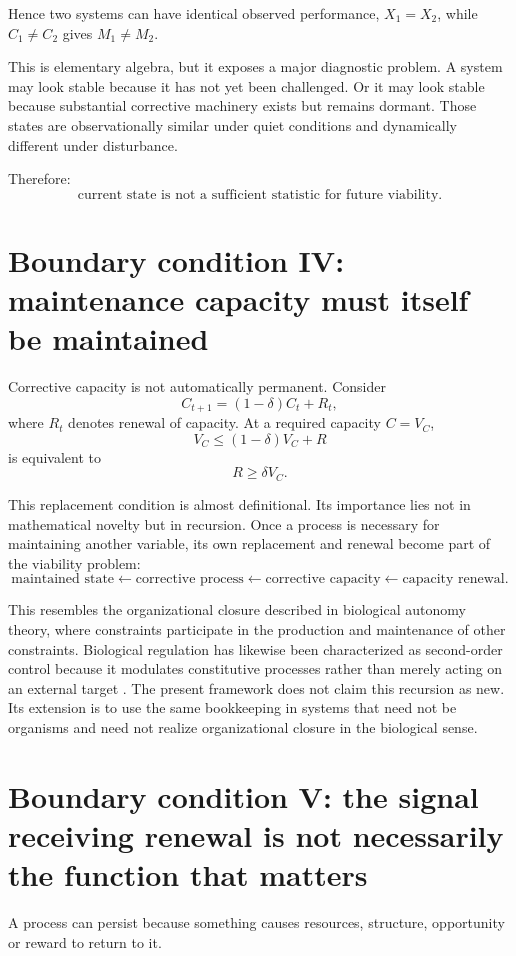 Hence two systems can have identical observed performance, \(X_1=X_2\), while \(C_1\neq C_2\) gives \(M_1\neq M_2\).

This is elementary algebra, but it exposes a major diagnostic problem. A system may look stable because it has not yet been challenged. Or it may look stable because substantial corrective machinery exists but remains dormant. Those states are observationally similar under quiet conditions and dynamically different under disturbance.

Therefore:
\[
\boxed{
\text{current state is not a sufficient statistic for future viability.}
}
\]

\section{Boundary condition IV: maintenance capacity must itself be maintained}

Corrective capacity is not automatically permanent. Consider
\[
C_{t+1}=(1-\delta)C_t+R_t,
\]
where \(R_t\) denotes renewal of capacity. At a required capacity \(C=V_C\),
\[
V_C\le(1-\delta)V_C+R
\]
is equivalent to
\[
\boxed{
R\ge\delta V_C.
}
\]

This replacement condition is almost definitional. Its importance lies not in mathematical novelty but in recursion. Once a process is necessary for maintaining another variable, its own replacement and renewal become part of the viability problem:
\[
\text{maintained state}
\leftarrow
\text{corrective process}
\leftarrow
\text{corrective capacity}
\leftarrow
\text{capacity renewal}.
\]

This resembles the organizational closure described in biological autonomy theory, where constraints participate in the production and maintenance of other constraints. Biological regulation has likewise been characterized as second-order control because it modulates constitutive processes rather than merely acting on an external target \citep{bich2016}. The present framework does not claim this recursion as new. Its extension is to use the same bookkeeping in systems that need not be organisms and need not realize organizational closure in the biological sense.

\section{Boundary condition V: the signal receiving renewal is not necessarily the function that matters}

A process can persist because something causes resources, structure, opportunity or reward to return to it.

